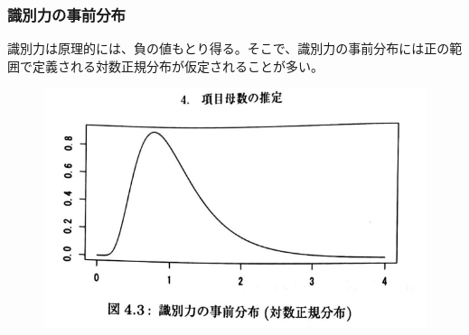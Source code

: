 \documentclass[12pt]{jarticle}
\begin{document}
\subsubsection{識別力の事前分布}
識別力は原理的には、負の値もとり得る。そこで、識別力の事前分布には正の範囲で定義される対数正規分布が仮定されることが多い。
\begin{center}
\begin{figure}[H]
  \includegraphics[bb = -500 300 1 1,scale = 0.3]{対数正規分布.png}
\end{figure}
\end{center}
\newpage
\end{document}

